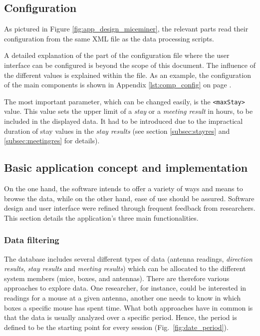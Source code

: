 \subsection{Configuration}
\label{subsec:miceminer_config}

As pictured in Figure \ref{fig:app_design_miceminer}, the relevant parts read their configuration from the same XML file as the data processing scripts. 

A detailed explanation of the part of the configuration file where the user interface can be configured is beyond the scope of this document. The influence of the different values is explained within the file. As an example, the configuration of the main components is shown in Appendix \ref{lst:comp_config} on page \pageref{lst:comp_config}.

The most important parameter, which can be changed easily, is the \lstinline|<maxStay>| value. This value sets the upper limit of a \textit{stay} or a \textit{meeting result} in hours, to be included in the displayed data. It had to be introduced due to the impractical duration of stay values in the \textit{stay results} (see section \ref{subsec:stayres} and \ref{subsec:meetingres} for details).

\subsection{Basic application concept and implementation}
\label{subsec:app_concept}

On the one hand, the software intends to offer a variety of ways and means to browse the data, while on the other hand, ease of use should be assured. Software design and user interface were refined through frequent feedback from researchers. This section details the application's three main functionalities.
   
\subsubsection{Data filtering}
\label{sububsec:datafilter}

The database includes several different types of data (antenna readings, \textit{direction results}, \textit{stay results} and \textit{meeting results}) which can be allocated to the different system members (mice, boxes, and antennas). There are therefore various approaches to explore data. One researcher, for instance, could be interested in readings for a mouse at a given antenna, another one needs to know in which boxes a specific mouse has spent time. What both approaches have in common is that the data is usually analyzed over a specific period. Hence, the period is defined to be the starting point for every session (Fig.~\ref{fig:date_period}).

